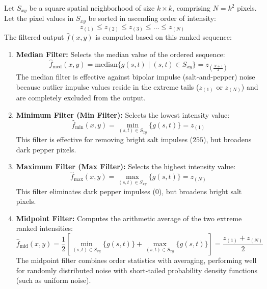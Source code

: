 \documentclass[12pt]{article}
\begin{document}
Let $S_{xy}$ be a square spatial neighborhood of size $k \times k$, comprising $N = k^2$ pixels. Let the pixel values in $S_{xy}$ be sorted in ascending order of intensity:
\begin{equation}
    z_{(1)} \le z_{(2)} \le z_{(3)} \le \dots \le z_{(N)}
\end{equation}
The filtered output $\hat{f}(x, y)$ is computed based on this ranked sequence:

\begin{enumerate}
    \item \textbf{Median Filter:} Selects the median value of the ordered sequence:
    \begin{equation}
        \hat{f}_{\text{med}}(x, y) = \text{median}\{g(s, t) \mid (s, t) \in S_{xy}\} = z_{\left(\frac{N+1}{2}\right)}
    \end{equation}
    The median filter is effective against bipolar impulse (salt-and-pepper) noise because outlier impulse values reside in the extreme tails ($z_{(1)}$ or $z_{(N)}$) and are completely excluded from the output.

    \item \textbf{Minimum Filter (Min Filter):} Selects the lowest intensity value:
    \begin{equation}
        \hat{f}_{\text{min}}(x, y) = \min_{(s, t) \in S_{xy}} \{g(s, t)\} = z_{(1)}
    \end{equation}
    This filter is effective for removing bright salt impulses ($255$), but broadens dark pepper pixels.

    \item \textbf{Maximum Filter (Max Filter):} Selects the highest intensity value:
    \begin{equation}
        \hat{f}_{\text{max}}(x, y) = \max_{(s, t) \in S_{xy}} \{g(s, t)\} = z_{(N)}
    \end{equation}
    This filter eliminates dark pepper impulses ($0$), but broadens bright salt pixels.

    \item \textbf{Midpoint Filter:} Computes the arithmetic average of the two extreme ranked intensities:
    \begin{equation}
        \hat{f}_{\text{mid}}(x, y) = \frac{1}{2} \left[ \min_{(s, t) \in S_{xy}} \{g(s, t)\} + \max_{(s, t) \in S_{xy}} \{g(s, t)\} \right] = \frac{z_{(1)} + z_{(N)}}{2}
    \end{equation}
    The midpoint filter combines order statistics with averaging, performing well for randomly distributed noise with short-tailed probability density functions (such as uniform noise).


\end{enumerate}
\end{document}
